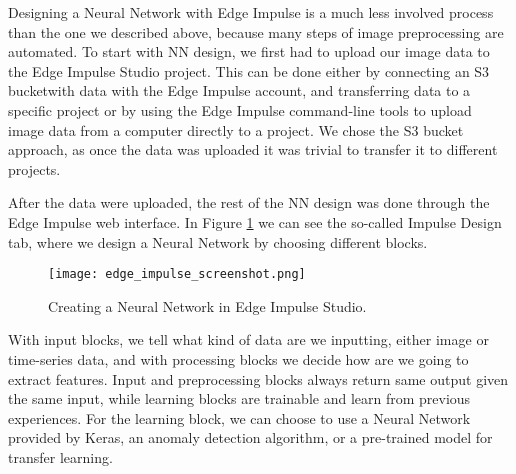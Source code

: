 Designing a Neural Network with Edge Impulse is a much less involved process than the one we described above, because many steps of image preprocessing are automated.
To start with NN design, we first had to upload our image data to the Edge Impulse Studio project.
This can be done either by connecting an S3 bucket\footnotemark with data with the Edge Impulse account, and transferring data to a specific project or by using the Edge Impulse command-line tools to upload image data from a computer directly to a project.
We chose the S3 bucket approach, as once the data was uploaded it was trivial to transfer it to different projects.

After the data were uploaded, the rest of the NN design was done through the Edge Impulse web interface.
In Figure \ref{edge_impulse_screenshot} we can see the so-called Impulse Design tab, where we design a Neural Network by choosing different blocks.
\newline
\begin{figure}[ht]
    \centering
    \texttt{[image: edge\_impulse\_screenshot.png]} 
    \caption{Creating a Neural Network in Edge Impulse Studio.}
    \label{edge_impulse_screenshot}
\end{figure}

With input blocks, we tell what kind of data are we inputting, either image or time-series data, and with processing blocks we decide how are we going to extract features.
Input and preprocessing blocks always return same output given the same input, while learning blocks are trainable and learn from previous experiences.
For the learning block, we can choose to use a Neural Network provided by Keras, an anomaly detection algorithm, or a pre-trained model for transfer learning.

